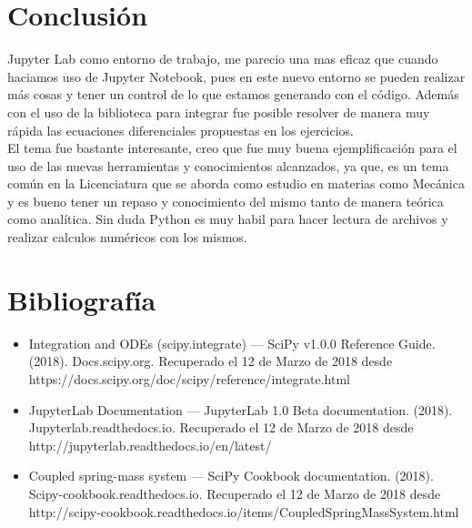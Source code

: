 \documentclass[12pt]{article}
\begin{document}
\section*{Conclusión}
Jupyter Lab como entorno de trabajo, me parecio una mas eficaz que cuando haciamos uso de Jupyter Notebook, pues en este nuevo entorno se pueden realizar más cosas y tener un control de lo que estamos generando con el código. Además con el uso de la biblioteca para integrar fue posible resolver de manera muy rápida las ecuaciones diferenciales propuestas en los ejercicios.\\

El tema fue bastante interesante, creo que fue muy buena ejemplificación para el uso de las nuevas herramientas y conocimientos alcanzados, ya que, es un tema común en la Licenciatura que se aborda como estudio en materias como Mecánica y es bueno tener un repaso y conocimiento del mismo tanto de manera teórica como analítica. Sin duda Python es muy habil para hacer lectura de archivos y realizar calculos numéricos con los mismos.

\section*{Bibliografía}
\begin{itemize}
\item Integration and ODEs (scipy.integrate) — SciPy v1.0.0 Reference Guide. (2018). Docs.scipy.org. Recuperado el 12 de Marzo de 2018 desde\\
https://docs.scipy.org/doc/scipy/reference/integrate.html
\item  JupyterLab Documentation — JupyterLab 1.0 Beta documentation. (2018). Jupyterlab.readthedocs.io.  Recuperado el 12 de Marzo de 2018 desde \\
http://jupyterlab.readthedocs.io/en/latest/
\item Coupled spring-mass system — SciPy Cookbook documentation. (2018). Scipy-cookbook.readthedocs.io. Recuperado el 12 de Marzo de 2018 desde\\
http://scipy-cookbook.readthedocs.io/items/CoupledSpringMassSystem.html
\end{itemize}
\end{document}
